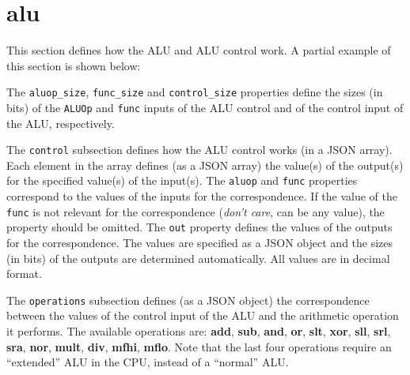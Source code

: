 \documentclass[11pt,a4paper,twoside,titlepage]{report}
\begin{document}
\section{alu}

This section defines how the ALU and ALU control work.
A partial example of this section is shown below:



The \verb+aluop_size+, \verb+func_size+ and \verb+control_size+ properties
define the sizes (in bits) of the \verb+ALUOp+ and \verb+func+ inputs of the
ALU control and of the control input of the ALU, respectively.

The \verb+control+ subsection defines how the ALU control works (in a JSON array).
Each element in the array defines (as a JSON array) the value(s) of the output(s)
for the specified value(s) of the input(s).
The \verb+aluop+ and \verb+func+ properties correspond to the values of the
inputs for the correspondence. If the value of the \verb+func+ is not relevant
for the correspondence (\emph{don't care}, can be any value), the property 
should be omitted.
The \verb+out+ property defines the values of the outputs for the correspondence.
The values are specified as a JSON object and the sizes (in bits) of the outputs
are determined automatically.
All values are in decimal format.

The \verb+operations+ subsection defines (as a JSON object) the correspondence 
between the values of the control input of the ALU and the arithmetic operation 
it performs.
The available operations are: \textbf{add}, \textbf{sub}, \textbf{and}, \textbf{or},
\textbf{slt}, \textbf{xor}, \textbf{sll}, \textbf{srl}, \textbf{sra}, \textbf{nor},
\textbf{mult}, \textbf{div}, \textbf{mfhi}, \textbf{mflo}.
Note that the last four operations require an ``extended'' ALU in the CPU, instead 
of a ``normal'' ALU.
\end{document}
